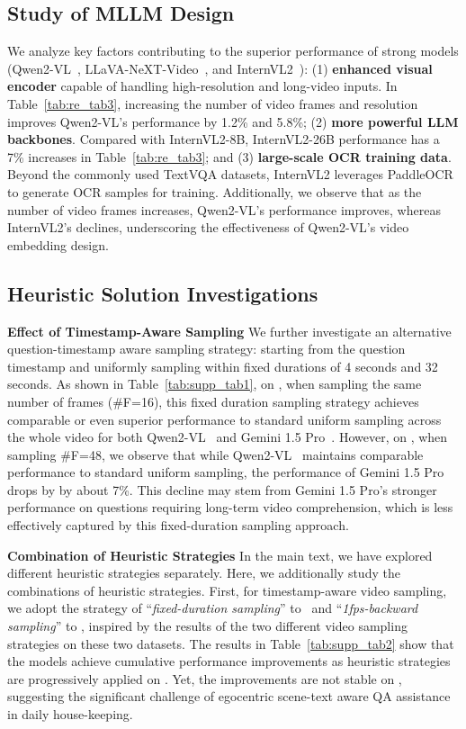 \subsection{Study of MLLM Design}
\label{sup:model_design}
We analyze key factors contributing to the superior performance of strong models (Qwen2-VL~\cite{wang2024qwen2}, LLaVA-NeXT-Video~\cite{zhang2024llavanextvideo}, and InternVL2~\cite{chen2024internvl}): 
(1) \textbf{enhanced visual encoder} capable of handling high-resolution and long-video inputs. In Table~\ref{tab:re_tab3}, increasing the number of video frames and resolution improves Qwen2-VL's performance by 1.2\% and 5.8\%;
(2) \textbf{more powerful LLM backbones}. Compared with InternVL2-8B, InternVL2-26B  performance has a 7\% increases in Table~\ref{tab:re_tab3}; and 
(3) \textbf{large-scale OCR training data}. Beyond the commonly used TextVQA datasets, InternVL2 leverages PaddleOCR to generate OCR samples for training. 
Additionally, we observe that as the number of video frames increases, Qwen2-VL's performance improves, whereas InternVL2's declines, underscoring the effectiveness of Qwen2-VL's video embedding design. 


\subsection{Heuristic Solution Investigations}
\label{sup:heuristic}
\noindent\textbf{Effect of Timestamp-Aware Sampling}
We further investigate an alternative question-timestamp aware sampling strategy: starting from the question timestamp and uniformly sampling within fixed durations of 4 seconds and 32 seconds. As shown in Table~\ref{tab:supp_tab1}, on \datasetout, when sampling the same number of frames (\#F=16), this fixed duration sampling strategy achieves comparable or even superior performance to standard uniform sampling across the whole video for both Qwen2-VL~\cite{wang2024qwen2} and Gemini 1.5 Pro~\cite{reid2024gemini}. However, on \datasetin, when sampling \#F=48, we observe that while Qwen2-VL~\cite{wang2024qwen2} maintains comparable performance to standard uniform sampling, the performance of Gemini 1.5 Pro~\cite{reid2024gemini} drops by by about 7\%. This decline may stem from Gemini 1.5 Pro's stronger performance on questions requiring long-term video comprehension, which is less effectively captured by this fixed-duration sampling approach.


\noindent\textbf{Combination of Heuristic Strategies}
In the main text, we have explored different heuristic strategies separately. Here, we additionally study the combinations of heuristic strategies. First, for timestamp-aware video sampling, we adopt the strategy of ``\emph{fixed-duration sampling}'' to \datasetout~and ``\emph{1fps-backward sampling}'' to \datasetin, inspired by the results of the two different video sampling strategies on these two datasets.  
The results in Table~\ref{tab:supp_tab2} show that the models achieve cumulative performance improvements as heuristic strategies are progressively applied on \datasetout. Yet, the improvements are not stable on \datasetin, suggesting the significant challenge of egocentric scene-text aware QA assistance in daily house-keeping. 

